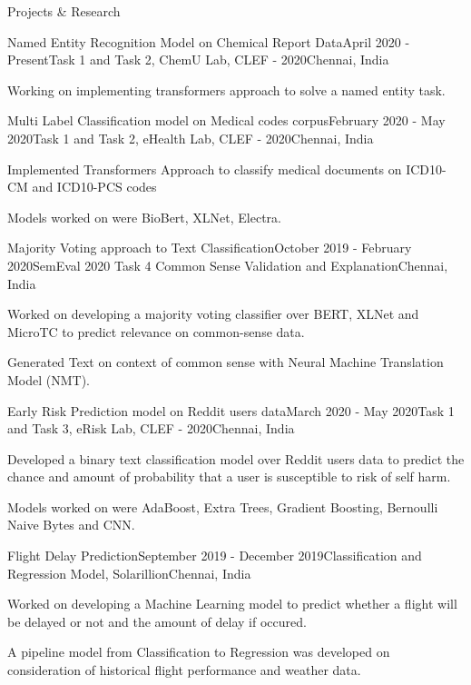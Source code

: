 \documentclass{resume} %
\begin{document}
\begin{rSection}{Projects \& Research}


\begin{rSubsection}{Named Entity Recognition Model on Chemical Report Data}{April 2020 - Present}{Task 1 and Task 2, ChemU Lab, CLEF - 2020}{Chennai, India}
\item Working on implementing transformers approach to solve a named entity task. 
\end{rSubsection}

\begin{rSubsection}{Multi Label Classification model on Medical codes corpus}{February 2020 - May 2020}{Task 1 and Task 2, eHealth Lab, CLEF - 2020}{Chennai, India}
\item Implemented Transformers Approach to classify medical documents on  ICD10-CM and ICD10-PCS codes
\item Models worked on were BioBert, XLNet, Electra. 
\end{rSubsection}

\begin{rSubsection}{Majority Voting approach to Text Classification}{October 2019 - February 2020}{SemEval 2020 Task 4 Common Sense Validation and Explanation}{Chennai, India}
\item Worked on developing a majority voting classifier over BERT, XLNet and MicroTC to predict relevance on common-sense data.
\item Generated Text on context of common sense with Neural Machine Translation Model (NMT). 
\end{rSubsection}

\begin{rSubsection}{Early Risk Prediction model on Reddit users data}{March 2020 - May 2020}{Task 1 and Task 3, eRisk Lab, CLEF - 2020}{Chennai, India}
\item Developed a binary text classification model over Reddit users data to predict the chance and amount of probability that a user is susceptible to risk of self harm.
\item Models worked on were AdaBoost, Extra Trees, Gradient Boosting, Bernoulli Naive Bytes and CNN.
\end{rSubsection}




\begin{rSubsection}{Flight Delay Prediction}{September 2019 - December 2019}{Classification and Regression Model, Solarillion}{Chennai, India}
\item Worked on developing a Machine Learning model to predict whether a flight will be delayed or not and the amount of delay if occured.
\item A pipeline model from Classification to Regression was developed on consideration of historical flight performance and weather data. 
\end{rSubsection}

\end{rSection}
\end{document}
